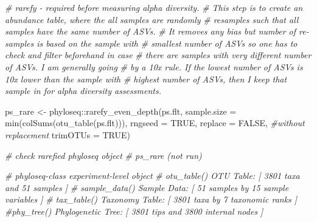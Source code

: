 \documentclass[
]{book}
\newenvironment{Shaded}{\begin{snugshade}}{\end{snugshade}}
\newcommand{\AttributeTok}[1]{\textcolor[rgb]{0.77,0.63,0.00}{#1}}
\newcommand{\CommentTok}[1]{\textcolor[rgb]{0.56,0.35,0.01}{\textit{#1}}}
\newcommand{\ConstantTok}[1]{\textcolor[rgb]{0.00,0.00,0.00}{#1}}
\newcommand{\FunctionTok}[1]{\textcolor[rgb]{0.00,0.00,0.00}{#1}}
\newcommand{\NormalTok}[1]{#1}
\newcommand{\OtherTok}[1]{\textcolor[rgb]{0.56,0.35,0.01}{#1}}
\newcommand{\SpecialCharTok}[1]{\textcolor[rgb]{0.00,0.00,0.00}{#1}}
\begin{document}
\begin{Shaded}
\begin{Highlighting}[]
\CommentTok{\# rarefy {-} required before measuring alpha diversity. }
\CommentTok{\# This step is to create an abundance table, where the all samples are randomly }
\CommentTok{\# resamples such that all samples have the same number of ASVs.  }
\CommentTok{\# It removes any bias but number of re{-}samples is based on the sample with }
\CommentTok{\# smallest number of ASVs so one has to check and filter beforehand in case }
\CommentTok{\# there are samples with very different number of ASVs. I am generally going }
\CommentTok{\# by a 10x rule. If the lowest number of ASVs is 10x lower than the sample with}
\CommentTok{\# highest number of ASVs, then I keep that sample in for alpha diversity assessments.  }

\NormalTok{ps\_rare }\OtherTok{\textless{}{-}}\NormalTok{ phyloseq}\SpecialCharTok{::}\FunctionTok{rarefy\_even\_depth}\NormalTok{(ps.flt, }
    \AttributeTok{sample.size =} \FunctionTok{min}\NormalTok{(}\FunctionTok{colSums}\NormalTok{(}\FunctionTok{otu\_table}\NormalTok{(ps.flt))),  }
    \AttributeTok{rngseed =} \ConstantTok{TRUE}\NormalTok{, }
    \AttributeTok{replace =} \ConstantTok{FALSE}\NormalTok{, }\CommentTok{\#without replacement}
    \AttributeTok{trimOTUs =} \ConstantTok{TRUE}\NormalTok{)}

\CommentTok{\# check rarefied phyloseq object}
\CommentTok{\# ps\_rare (not run)}

\CommentTok{\# phyloseq{-}class experiment{-}level object}
\CommentTok{\# otu\_table()   OTU Table:         [ 3801 taxa and 51 samples ]}
\CommentTok{\# sample\_data() Sample Data:       [ 51 samples by 15 sample variables ]}
\CommentTok{\# tax\_table()   Taxonomy Table:    [ 3801 taxa by 7 taxonomic ranks ]}
 \CommentTok{\#phy\_tree()    Phylogenetic Tree: [ 3801 tips and 3800 internal nodes ]}


\end{Highlighting}
\end{Shaded}
\end{document}
